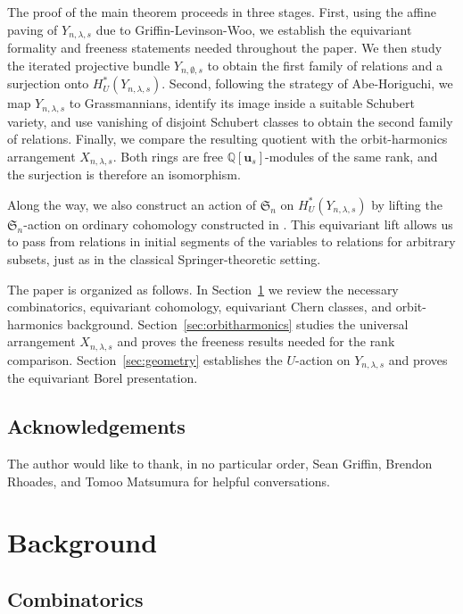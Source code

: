 \documentclass[11pt]{amsart}
\numberwithin{equation}{section}
\theoremstyle{definition}
\newcommand{\symm}{{\mathfrak{S}}}
\newcommand{\QQ}{{\mathbb{Q}}}
\newcommand{\uuu}{{\mathbf{u}}}
\begin{document}
The proof of the main theorem proceeds in three stages. First, using the affine
paving of $Y_{n,\lambda,s}$ due to Griffin-Levinson-Woo, we establish the
equivariant formality and freeness statements needed throughout the paper.
We then study the iterated projective bundle $Y_{n,\emptyset,s}$ to obtain the
first family of relations and a surjection onto $H_U^*(Y_{n,\lambda,s})$.
Second, following the strategy of Abe-Horiguchi, we map $Y_{n,\lambda,s}$ to
Grassmannians, identify its image inside a suitable Schubert variety, and use
vanishing of disjoint Schubert classes to obtain the second family of relations.
Finally, we compare the resulting quotient with the orbit-harmonics arrangement
$X_{n,\lambda,s}$. Both rings are free $\QQ[\uuu_s]$-modules of the same rank,
and the surjection is therefore an isomorphism.

Along the way, we also construct an action of $\symm_n$ on
$H_U^*(Y_{n,\lambda,s})$ by lifting the $\symm_n$-action on ordinary cohomology
constructed in \cite{GLW}. This equivariant lift allows us to pass from relations
in initial segments of the variables to relations for arbitrary subsets, just as
in the classical Springer-theoretic setting.

The paper is organized as follows. In Section~\ref{sec:background} we review the
necessary combinatorics, equivariant cohomology, equivariant Chern classes, and
orbit-harmonics background. Section~\ref{sec:orbitharmonics} studies the universal
arrangement $X_{n,\lambda,s}$ and proves the freeness results needed for the rank
comparison. Section~\ref{sec:geometry} establishes the $U$-action on
$Y_{n,\lambda,s}$ and proves the equivariant Borel presentation.

\subsection{Acknowledgements}

The author would like to thank, in no particular order, Sean Griffin, Brendon Rhoades, and Tomoo Matsumura for helpful conversations. 


\section{Background}\label{sec:background}

\subsection{Combinatorics}
\end{document}
